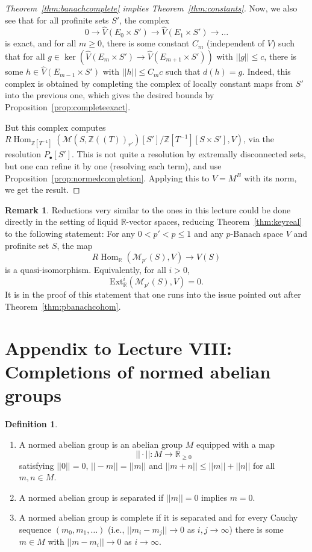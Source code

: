 \documentclass[11pt]{amsbook}
\DeclareMathOperator{\Hom}{Hom}
\numberwithin{equation}{section}
\numberwithin{theorem}{section}
\theoremstyle{definition}
\newtheorem{remark}[theorem]{Remark}
\newtheorem{definition}[theorem]{Definition}
\begin{document}
\begin{proof}[Theorem~\ref{thm:banachcomplete} implies Theorem~\ref{thm:constants}]
Now, we also see that for all profinite sets $S'$, the complex
\[
0\to \widehat{V}(E_0\times S')\to \widehat{V}(E_1\times S')\to \ldots
\]
is exact, and for all $m\geq 0$, there is some constant $C_m$ (independent of $V$) such that for all $g\in \ker(\widehat{V}(E_m\times S')\to \widehat{V}(E_{m+1}\times S'))$ with $||g||\leq c$, there is some $h\in \widehat{V}(E_{m-1}\times S')$ with $||h||\leq C_mc$ such that $d(h)=g$. Indeed, this complex is obtained by completing the complex of locally constant maps from $S'$ into the previous one, which gives the desired bounds by Proposition~\ref{prop:completeexact}.

But this complex computes $R\Hom_{\mathbb Z[T^{-1}]}(\mathcal M(S,\mathbb Z((T))_{r'})[S']/\mathbb Z[T^{-1}][S\times S'],V)$, via the resolution $P_\bullet[S']$. This is not quite a resolution by extremally disconnected sets, but one can refine it by one (resolving each term), and use Proposition~\ref{prop:normedcompletion}. Applying this to $V=M^B$ with its norm, we get the result.
\end{proof}

\begin{remark} Reductions very similar to the ones in this lecture could be done directly in the setting of liquid $\mathbb R$-vector spaces, reducing Theorem~\ref{thm:keyreal} to the following statement: For any $0<p'<p\leq 1$ and any $p$-Banach space $V$ and profinite set $S$, the map
\[
R\Hom_{\mathbb R}(\mathcal M_{p'}(S),V)\to V(S)
\]
is a quasi-isomorphism. Equivalently, for all $i>0$,
\[
\mathrm{Ext}^i_{\mathbb R}(\mathcal M_{p'}(S),V)=0.
\]
It is in the proof of this statement that one runs into the issue pointed out after Theorem~\ref{thm:pbanachcohom}.
\end{remark}

\newpage

\section*{Appendix to Lecture VIII: Completions of normed abelian groups}

\begin{definition}\label{def:normedabelian}\leavevmode
\begin{enumerate}
\item A normed abelian group is an abelian group $M$ equipped with a map
\[
||\cdot||: M\to \mathbb R_{\geq 0}
\]
satisfying $||0||=0$, $||-m||=||m||$ and $||m+n||\leq ||m||+||n||$ for all $m,n\in M$.
\item A normed abelian group is separated if $||m||=0$ implies $m=0$.
\item A normed abelian group is complete if it is separated and for every Cauchy sequence $(m_0,m_1,\ldots)$ (i.e., $||m_i-m_j||\to 0$ as $i,j\to \infty$) there is some $m\in M$ with $||m-m_i||\to 0$ as $i\to \infty$.
\end{enumerate}
\end{definition}
\end{document}
